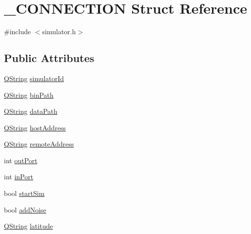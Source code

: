 \hypertarget{struct___c_o_n_n_e_c_t_i_o_n}{\section{\-\_\-\-C\-O\-N\-N\-E\-C\-T\-I\-O\-N \-Struct \-Reference}
\label{struct___c_o_n_n_e_c_t_i_o_n}
}


{\ttfamily \#include $<$simulator.\-h$>$}

\subsection*{\-Public \-Attributes}
\begin{DoxyCompactItemize}
\item 
\hyperlink{group___u_a_v_objects_plugin_gab9d252f49c333c94a72f97ce3105a32d}{\-Q\-String} \hyperlink{group___h_i_t_l_plugin_gae2769b70fdfc601ee4d7fc19c08bfe59}{simulator\-Id}
\item 
\hyperlink{group___u_a_v_objects_plugin_gab9d252f49c333c94a72f97ce3105a32d}{\-Q\-String} \hyperlink{group___h_i_t_l_plugin_ga7bd6d35f193af2ec2365db4a4faaf7e7}{bin\-Path}
\item 
\hyperlink{group___u_a_v_objects_plugin_gab9d252f49c333c94a72f97ce3105a32d}{\-Q\-String} \hyperlink{group___h_i_t_l_plugin_ga4505c573ba399fc3e915fec6842c3bcb}{data\-Path}
\item 
\hyperlink{group___u_a_v_objects_plugin_gab9d252f49c333c94a72f97ce3105a32d}{\-Q\-String} \hyperlink{group___h_i_t_l_plugin_ga21da3bd31909fdf7fd5116c2a91a1176}{host\-Address}
\item 
\hyperlink{group___u_a_v_objects_plugin_gab9d252f49c333c94a72f97ce3105a32d}{\-Q\-String} \hyperlink{group___h_i_t_l_plugin_ga72b83e685c950b6c36c9eed28c775ec4}{remote\-Address}
\item 
int \hyperlink{group___h_i_t_l_plugin_gaaba6cf28320e1105f7320ea8a21df15b}{out\-Port}
\item 
int \hyperlink{group___h_i_t_l_plugin_gabf3d6472bdcac5895a53143e1f84fb09}{in\-Port}
\item 
bool \hyperlink{group___h_i_t_l_plugin_ga17c6b00bf3f43c686cca76b3286ba75c}{start\-Sim}
\item 
bool \hyperlink{group___h_i_t_l_plugin_ga0d3c230504eb051a77593129ea6cd79f}{add\-Noise}
\item 
\hyperlink{group___u_a_v_objects_plugin_gab9d252f49c333c94a72f97ce3105a32d}{\-Q\-String} \hyperlink{group___h_i_t_l_plugin_gac06d25b8e020f633a60fadb7e7eedfa9}{latitude}

\end{DoxyCompactItemize}
